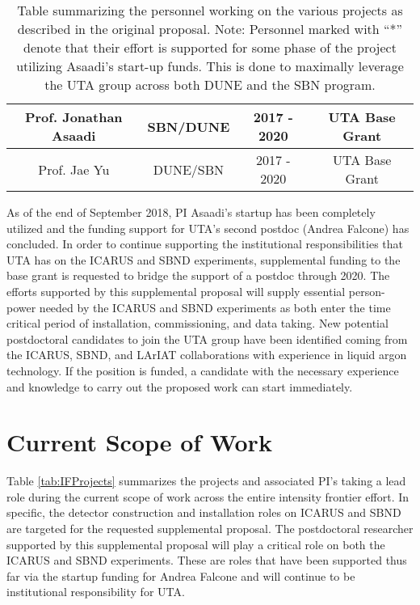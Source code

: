 \begin{table}[htb]
\begin{center}
{\begin{tabular}{c|c|c|c}
    
    Prof. Jonathan Asaadi & SBN/DUNE & 2017 - 2020 & UTA Base Grant \\
     \hline
    Prof. Jae Yu & DUNE/SBN & 2017 - 2020 & UTA Base Grant \\
     \hline
    \end{tabular}}
    \caption{Table summarizing the personnel working on the various projects as described in the original proposal. Note: Personnel marked with ``*'' denote that their effort is supported for some phase of the project utilizing Asaadi's start-up funds. This is done to maximally leverage the UTA group across both DUNE and the SBN program.} \label{tab:People}
    \end{center}
\end{table}

As of the end of September 2018, PI Asaadi's startup has been completely utilized and the funding support for UTA's second postdoc (Andrea Falcone) has concluded. In order to continue supporting the institutional responsibilities that UTA has on the ICARUS and SBND experiments, supplemental funding to the base grant is requested to bridge the support of a postdoc through 2020. The efforts supported by this supplemental proposal will supply essential person-power needed by the ICARUS and SBND experiments as both enter the time critical period of installation, commissioning, and data taking. New potential postdoctoral candidates to join the UTA group have been identified coming from the ICARUS, SBND, and LArIAT collaborations with experience in liquid argon technology. If the position is funded, a candidate with the necessary experience and knowledge to carry out the proposed work can start immediately. 

\section*{Current Scope of Work}

Table \ref{tab:IFProjects} summarizes the projects and associated PI's taking a lead role during the current scope of work across the entire intensity frontier effort. In specific, the detector construction and installation roles on ICARUS and SBND are targeted for the requested supplemental proposal. The postdoctoral researcher supported by this supplemental proposal will play a critical role on both the ICARUS and SBND experiments. These are roles that have been supported thus far via the startup funding for Andrea Falcone and will continue to be institutional responsibility for UTA.

